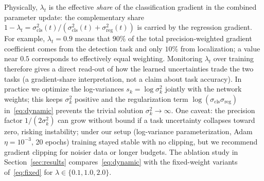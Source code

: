 \documentclass[5p,twocolumn]{elsarticle}
\begin{document}
Physically, $\lambda_t$ is the effective \emph{share} of the classification gradient in the combined parameter update: the complementary share $1-\lambda_t=\sigma_{\mathrm{cls}}^{2}(t)/(\sigma_{\mathrm{cls}}^{2}(t)+\sigma_{\mathrm{reg}}^{2}(t))$ is carried by the regression gradient. For example, $\lambda_t=0.9$ means that $90\%$ of the total precision-weighted gradient coefficient comes from the detection task and only $10\%$ from localization; a value near $0.5$ corresponds to effectively equal weighting. Monitoring $\lambda_t$ over training therefore gives a direct read-out of how the learned uncertainties trade the two tasks (a gradient-share interpretation, not a claim about task accuracy). In practice we optimize the log-variances $s_k=\log\sigma_k^{2}$ jointly with the network weights; this keeps $\sigma_k^{2}$ positive and the regularization term $\log(\sigma_{\mathrm{cls}}\sigma_{\mathrm{reg}})$ in~\eqref{eq:dynamic} prevents the trivial solution $\sigma_k^{2}\!\to\!\infty$. One caveat: the precision factor $1/(2\sigma_k^{2})$ can grow without bound if a task uncertainty collapses toward zero, risking instability; under our setup (log-variance parameterization, Adam $\eta=10^{-3}$, 20 epochs) training stayed stable with no clipping, but we recommend gradient clipping for noisier data or longer budgets. The ablation study in Section~\ref{sec:results} compares~\eqref{eq:dynamic} with the fixed-weight variants of~\eqref{eq:fixed} for $\lambda\in\{0.1,1.0,2.0\}$.
\end{document}
